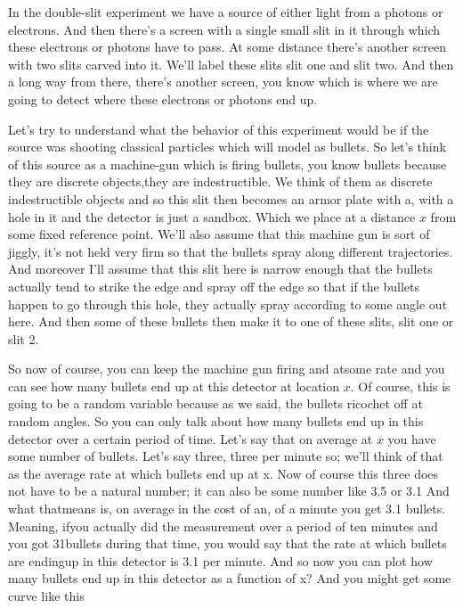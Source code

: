 \documentclass{article}
\newcommand{\<}{\langle}
\renewcommand{\>}{\rangle}
\begin{document}
In the double-slit experiment we have a source of either light from a photons or electrons. And then there's a screen with a single small slit in it through which these electrons or photons have to pass. At some distance there's another screen with two slits carved into it. We'll label these slits slit one and slit two. And then a long way from there, there's another screen, you know which is where we are going to detect where these electrons or photons end up. 

Let's try to understand what the behavior of this experiment would be if the source was shooting classical particles which will model as bullets. So let's think of this source as a machine-gun which is firing bullets, you know bullets because they are discrete objects,they are indestructible. We think of them as discrete indestructible objects and so this slit then becomes an armor plate with a, with a hole in it and the detector is just a sandbox. Which we place at a distance $x$ from some fixed reference point. We'll also assume that this machine gun is sort of jiggly, it's not held very firm so that the bullets spray along different trajectories. And moreover I'll assume that this slit here is narrow enough that the bullets actually tend to strike the edge and spray off the edge so that if the bullets happen to go through this hole, they actually spray according to some angle out here. And then some of these bullets then make it to one of these slits, slit one or slit 2. 

So now of course, you can keep the machine gun firing and atsome rate and you can see how many bullets end up at this detector at location $x$. Of course, this is going to be a random variable because as we said, the bullets ricochet off at random angles. So you can only talk about how many bullets end up in this detector over a certain period of time. Let's say that on average at $x$ you have some number of bullets. Let's say three, three per minute so; we'll think of that as the average rate at which bullets end up at x. Now of course this three does not have to be a natural number; it can also be some number like 3.5 or 3.1 And what thatmeans is, on average in the cost of an, of a minute you get 3.1 bullets. Meaning, ifyou actually did the measurement over a period of ten minutes and you got 31bullets during that time, you would say that the rate at which bullets are endingup in this detector is 3.1 per minute. And so now you can plot how many bullets end up in this detector as a function of x? And you might get some curve like this 
\end{document}
